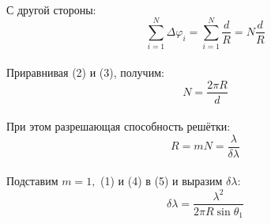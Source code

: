 \documentclass[a4paper]{article}
\begin{document}
\\
С другой стороны:
\begin{equation}\label{eq3}
\sum\limits_{i=1}^{N}\Delta\varphi_i=\sum\limits_{i=1}^{N}\displaystyle\frac{d}{R} = N \displaystyle \frac {d}{R}
\end{equation}
\\
Приравнивая (2) и (3), получим:
\begin{equation}\label{eq4}
N=\displaystyle\frac{2\pi R}{d}
\end{equation}
\\
При этом разрешающая способность решётки:
\begin{equation}\label{eq5}
R=mN=\displaystyle\frac{\lambda}{\delta\lambda}
\end{equation}
\\
Подставим $m=1,$ (1) и (4) в (5) и выразим $\delta\lambda$:
\begin{equation}\label{eq6}
\delta\lambda=\displaystyle\frac{\lambda^2}{2\pi R\sin\theta_1}
\end{equation}
\\
\pagebreak
\end{document}
